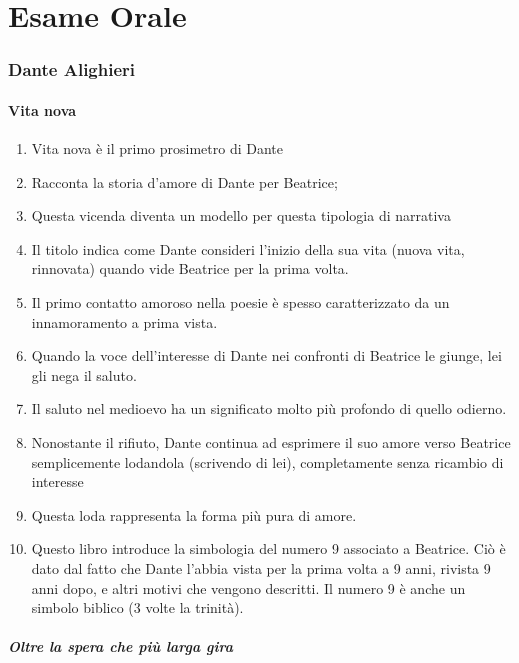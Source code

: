 \documentclass{article}
\begin{document}

\newpage

\part{Esame Orale}

\section{Dante Alighieri}

\subsection{Vita nova}

\begin{enumerate}
    \item Vita nova è il primo prosimetro di Dante
    \item Racconta la storia d'amore di Dante per Beatrice;
    \item Questa vicenda diventa un modello per questa tipologia di narrativa
    \item Il titolo indica come Dante consideri l’inizio della sua vita (nuova vita, rinnovata) quando
    vide Beatrice per la prima volta.
    \item Il primo contatto amoroso nella poesie è spesso caratterizzato da un
    innamoramento a prima vista.
    \item Quando la voce dell’interesse di Dante nei confronti di Beatrice le giunge, lei gli nega il saluto.
    \item Il saluto nel medioevo ha un significato molto più profondo di quello odierno.
    \item Nonostante il rifiuto, Dante continua ad esprimere il suo amore verso Beatrice semplicemente lodandola
    (scrivendo di lei), completamente senza ricambio di interesse
    \item Questa loda rappresenta la forma più pura di amore.
    \item Questo libro introduce la simbologia del numero 9 associato a Beatrice. Ciò è dato dal fatto che Dante
    l’abbia vista per la prima volta a 9 anni, rivista 9 anni dopo, e altri motivi che vengono descritti. Il numero
    9 è anche un simbolo biblico (3 volte la trinità).
\end{enumerate}

\subsubsection{Oltre la spera che più larga gira}
\end{document}
